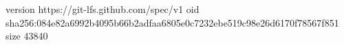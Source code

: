 version https://git-lfs.github.com/spec/v1
oid sha256:084e82a6992b4095b66b2adfaa6805e0c7232ebe519c98e26d6170f78567f851
size 43840
